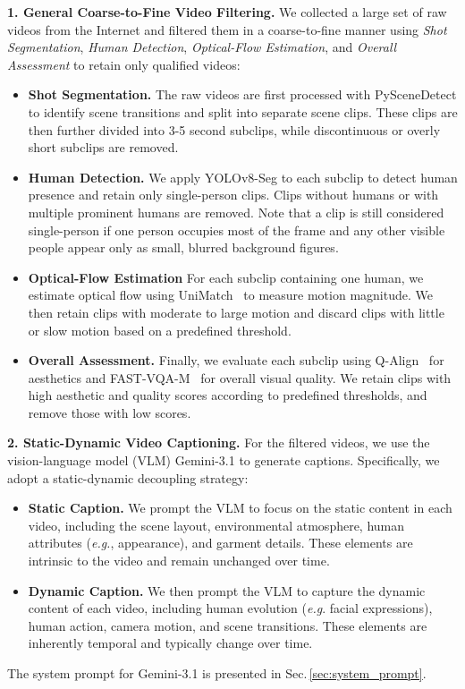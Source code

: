 \noindent
\textbf{1. General Coarse-to-Fine Video Filtering.}
% 
We collected a large set of raw videos from the Internet and filtered them in a coarse-to-fine manner using \textit{Shot Segmentation}, \textit{Human Detection}, \textit{Optical-Flow Estimation}, and \textit{Overall Assessment} to retain only qualified videos:
\begin{itemize}
    \item \textbf{Shot Segmentation.} The raw videos are first processed with PySceneDetect to identify scene transitions and split into separate scene clips. These clips are then further divided into 3-5 second subclips, while discontinuous or overly short subclips are removed.
    \item \textbf{Human Detection.} We apply YOLOv8-Seg to each subclip to detect human presence and retain only single-person clips. Clips without humans or with multiple prominent humans are removed. Note that a clip is still considered single-person if one person occupies most of the frame and any other visible people appear only as small, blurred background figures.
    \item \textbf{Optical-Flow Estimation} For each subclip containing one human, we estimate optical flow using UniMatch~\cite{li2025unimatch} to measure motion magnitude. We then retain clips with moderate to large motion and discard clips with little or slow motion based on a predefined threshold.
    \item \textbf{Overall Assessment.} Finally, we evaluate each subclip using Q-Align~\cite{wu2023q} for aesthetics and FAST-VQA-M~\cite{wu2022fast} for overall visual quality. We retain clips with high aesthetic and quality scores according to predefined thresholds, and remove those with low scores.
\end{itemize}



\noindent
\textbf{2. Static-Dynamic Video Captioning.}
% 
For the filtered videos, we use the vision-language model (VLM) Gemini-3.1 to generate captions. Specifically, we adopt a static-dynamic decoupling strategy:
\begin{itemize}
    \item \textbf{Static Caption.} We prompt the VLM to focus on the static content in each video, including the scene layout, environmental atmosphere, human attributes (\emph{e.g.}, appearance), and garment details. These elements are intrinsic to the video and remain unchanged over time.
    \item \textbf{Dynamic Caption.} We then prompt the VLM to capture the dynamic content of each video, including human evolution (\emph{e.g}. facial expressions), human action, camera motion, and scene transitions. These elements are inherently temporal and typically change over time.
\end{itemize}
% 
The system prompt for Gemini-3.1 is presented in Sec.\,\ref{sec:system_prompt}.

